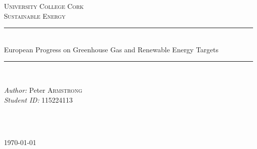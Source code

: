 \documentclass[12pt]{article} %
\begin{document}

\begin{titlepage}
  \newcommand{\HRule}{\rule{\linewidth}{0.5mm}} %

  \center %

  \textsc{\LARGE University College Cork}\\[1.5cm] %
  \textsc{\Large Sustainable Energy}\\[0.5cm] %

  \HRule \\[0.4cm]
  { \huge European Progress on Greenhouse Gas and Renewable Energy Targets}\\[0.5cm] %
  \HRule \\[1.5cm]

  \begin{minipage}{0.4\textwidth}
  \begin{flushleft} \large
  \emph{Author:} Peter \textsc{Armstrong} \\%
  \emph{Student ID:} 115224113
  \end{flushleft}
  \end{minipage}
  ~
  \begin{minipage}{0.4\textwidth}
  \begin{flushright} \large
  \end{flushright}
  \end{minipage}\\[4cm]

  {\large \today}\\[3cm] %


  \vfill %
\end{titlepage}
\end{document}
